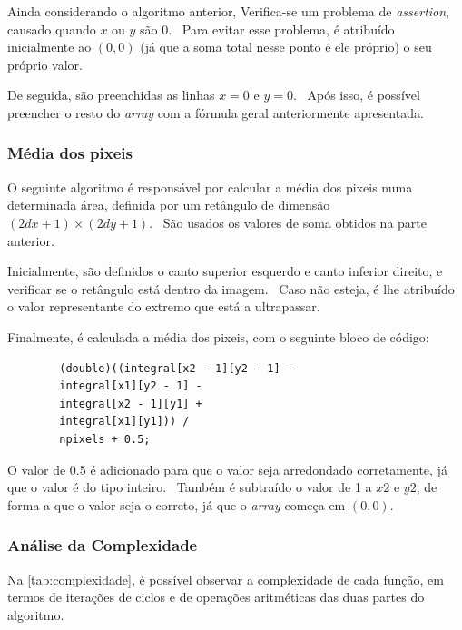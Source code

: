     \newpage

    \par Ainda considerando o algoritmo anterior, Verifica-se um problema de \textit{assertion}, causado quando $x$ ou $y$ são 0. \ Para evitar esse problema, é atribuído inicialmente ao $(0,0)$ (já que a soma total nesse ponto é ele próprio) o seu próprio valor.

    \par De seguida, são preenchidas as linhas $x = 0$ e $y = 0$. \ Após isso, é possível preencher o resto do \textit{array} com a fórmula geral anteriormente apresentada.

\subsubsection{Média dos pixeis}
    \par O seguinte algoritmo é responsável por calcular a média dos pixeis numa determinada área, definida por um retângulo de dimensão $(2dx + 1) \times (2dy + 1)$. \ São usados os valores de soma obtidos na parte anterior.

    \par Inicialmente, são definidos o canto superior esquerdo e canto inferior direito, e verificar se o retângulo está dentro da imagem. \ Caso não esteja, é lhe atribuído o valor representante do extremo que está a ultrapassar.

    \par Finalmente, é calculada a média dos pixeis, com o seguinte bloco de código:

    \begin{lstlisting}
        (double)((integral[x2 - 1][y2 - 1] -
        integral[x1][y2 - 1] -
        integral[x2 - 1][y1] +
        integral[x1][y1])) /
        npixels + 0.5;
    \end{lstlisting}

    \par O valor de 0.5 é adicionado para que o valor seja arredondado corretamente, já que o valor é do tipo inteiro. \ Também é subtraído o valor de 1 a $x2$ e $y2$, de forma a que o valor seja o correto, já que o \textit{array} começa em $(0,0)$.

\subsubsection{Análise da Complexidade}
    \par Na \autoref{tab:complexidade}, é possível observar a complexidade de cada função, em termos de iterações de ciclos e de operações aritméticas das duas partes do algoritmo.

